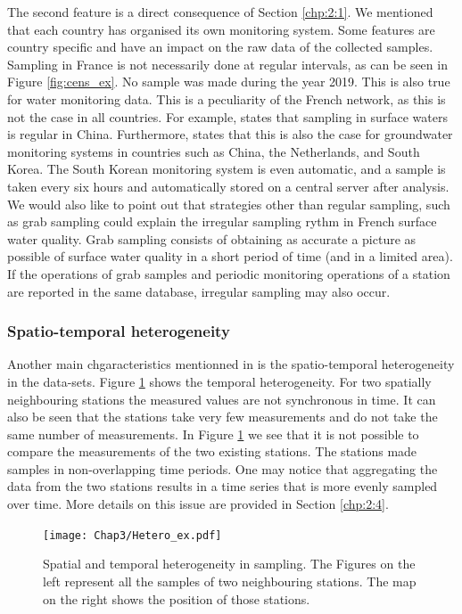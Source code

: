 The second feature is a direct consequence of Section \ref{chp:2:1}. We mentioned that each country has organised its own monitoring system. Some features are country specific and have an impact on the raw data of the collected samples. Sampling in France is not necessarily done at regular intervals, as can be seen in Figure \ref{fig:cens_ex}. No sample was made during the year 2019. This is also true for water monitoring data. This is a peculiarity of the French network, as this is not the case in all countries. For example, \cite{Zhang2008} states that sampling in surface waters is regular in China. Furthermore, \cite{Joergensen2008} states that this is also the case for groundwater monitoring systems in countries such as China, the Netherlands, and South Korea. The South Korean monitoring system is even automatic, and a sample is taken every six hours and automatically stored on a central server after analysis. We would also like to point out that strategies other than regular sampling, such as grab sampling \cite{Novic2017} could explain the irregular sampling rythm in French surface water quality. Grab sampling consists of obtaining as accurate a picture as possible of surface water quality in a short period of time (and in a limited area). If the operations of grab samples and periodic monitoring operations of a station are reported in the same database, irregular sampling may also occur.  

\subsubsection{Spatio-temporal heterogeneity}

Another main chgaracteristics mentionned in \cite{Baran2022} is the spatio-temporal heterogeneity in the data-sets. Figure \ref{fig:het_samp_ex} shows the temporal heterogeneity. For two spatially neighbouring stations the measured values are not synchronous in time. It can also be seen that the stations take very few measurements and do not take the same number of measurements. In Figure \ref{fig:het_samp_ex} we see that it is not possible to compare the measurements of the two existing stations. The stations made samples in non-overlapping time periods. One may notice that aggregating the data from the two stations results in a time series that is more evenly sampled over time. More details on this issue are provided in Section \ref{chp:2:4}. 

\begin{figure}[ht]
    \centering
    \texttt{[image: Chap3/Hetero\_ex.pdf]}
    \caption{Spatial and temporal heterogeneity in sampling. The Figures on the left represent all the samples of two neighbouring stations. The map on the right shows the position of those stations.}
    \label{fig:het_samp_ex}
\end{figure}

